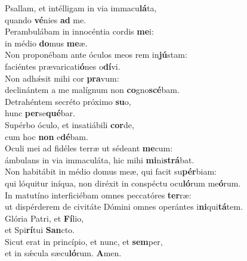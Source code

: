 \evenverse Psallam, et intélligam in via immacu\textbf{lá}ta,~\*\\
\evenverse quando \textbf{vé}nies \textbf{ad} me.\\
\oddverse Perambulábam in innocéntia cordis \textbf{me}i:~\*\\
\oddverse in médio \textbf{do}mus \textbf{me}æ.\\
\evenverse Non proponébam ante óculos meos rem in\textbf{jú}stam:~\*\\
\evenverse faciéntes prævaricati\textbf{ó}nes o\textbf{dí}vi.\\
\oddverse Non adhǽsit mihi cor \textbf{pra}vum:~\*\\
\oddverse declinántem a me malígnum non \textbf{co}gno\textbf{scé}bam.\\
\evenverse Detrahéntem secréto próximo \textbf{su}o,~\*\\
\evenverse hunc \textbf{per}se\textbf{qué}bar.\\
\oddverse Supérbo óculo, et insatiábili \textbf{cor}de,~\*\\
\oddverse cum hoc \textbf{non} e\textbf{dé}bam.\\
\evenverse Oculi mei ad fidéles terræ ut sédeant \textbf{me}cum:~\*\\
\evenverse ámbulans in via immaculáta, hic mihi \textbf{mi}ni\textbf{strá}bat.\\
\oddverse Non habitábit in médio domus meæ, qui facit su\textbf{pér}biam:~\*\\
\oddverse qui lóquitur iníqua, non diréxit in conspéctu ocu\textbf{ló}rum me\textbf{ó}rum.\\
\evenverse In matutíno interficiébam omnes peccatóres \textbf{ter}ræ:~\*\\
\evenverse ut dispérderem de civitáte Dómini omnes operántes i\textbf{ni}qui\textbf{tá}tem.\\
\oddverse Glória Patri, et \textbf{Fí}lio,~\*\\
\oddverse et Spi\textbf{rí}tui \textbf{San}cto.\\
\evenverse Sicut erat in princípio, et nunc, et \textbf{sem}per,~\*\\
\evenverse et in sǽcula sæcu\textbf{ló}rum. \textbf{A}men.\\
